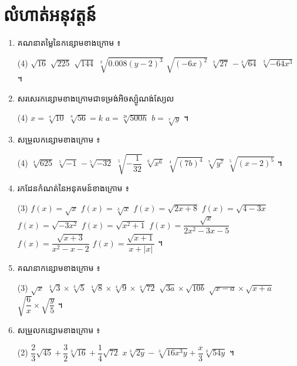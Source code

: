 \section*{លំហាត់អនុវត្តន៍}
\begin{enumerate}[1]
  \item គណនាតម្លៃនៃកន្សោមខាងក្រោម ៖
  \begin{tasks}(4)
    \task $\sqrt{16}$
    \task $\sqrt{225}$
    \task $\sqrt{144}$
    \task $\sqrt[3]{0.008(y - 2)^3}$
    \task $\sqrt{(-6x)^2}$
    \task $\sqrt[3]{27}$
    \task $-\sqrt[3]{64}$
    \task $\sqrt[3]{-64x^3}$ ។
  \end{tasks}
  \item សរសេរកន្សោមខាងក្រោមជាទម្រង់អិចស្ប៉ូណង់ស្យែល
  \begin{tasks}(4)
    \task $x = \sqrt[4]{10}$
    \task $\sqrt[8]{56} = k$
    \task $a = \sqrt[28]{500h}$
    \task $b = \sqrt[x]{y}$ ។
  \end{tasks}
  \item សម្រួលកន្សោមខាងក្រោម ៖
  \begin{tasks}(4)
    \task $\sqrt[4]{625}$
    \task $\sqrt[5]{-1}$
    \task $-\sqrt[5]{-32}$
    \task $\sqrt[5]{-\dfrac{1}{32}}$
    \task $\sqrt[6]{x^6}$
    \task $\sqrt[4]{(7b)^4}$
    \task $\sqrt[7]{y^7}$
    \task $\sqrt[5]{(x - 2)^5}$ ។
  \end{tasks}
  \item រកដែនកំណត់នៃអនុគមន៍ខាងក្រោម ៖
  \begin{tasks}(3)
    \task $f(x) = \sqrt{x}$
    \task $f(x) = \sqrt[3]{x}$
    \task $f(x) = \sqrt{2x + 8}$
    \task $f(x) = \sqrt{4 - 3x}$
    \task $f(x) = \sqrt{-3x^2}$
    \task $f(x) = \sqrt{x^2 + 1}$
    \task $f(x) = \dfrac{\sqrt{x}}{2x^2 - 3x - 5}$
    \task $f(x) = \dfrac{\sqrt{x + 3}}{x^2 - x - 2}$
    \task $f(x) = \dfrac{\sqrt{x + 1}}{x + |x|}$ ។
  \end{tasks}
  \item គណនាកន្សោមខាងក្រោម ៖
  \begin{tasks}(3)
    \task $\sqrt{x}$
    \task $\sqrt[3]{3} \times \sqrt[3]{5}$
    \task $\sqrt[4]{8} \times \sqrt[4]{9} \times \sqrt[4]{72}$
    \task $\sqrt{3a} \times \sqrt{10b}$
    \task $\sqrt{x - a} \times \sqrt{x + a}$
    \task $\sqrt{\dfrac{6}{x}} \times \sqrt{\dfrac{y}{5}}$ ។
  \end{tasks}
  \item សម្រួលកន្សោមខាងក្រោម ៖
  \begin{tasks}(2)
    \task $\dfrac{2}{3}\sqrt{45} + \dfrac{3}{2}\sqrt[3]{16} + \dfrac{1}{4}\sqrt{72}$
    \task $x\sqrt[3]{2y} - \sqrt[3]{16x^3y} + \dfrac{x}{3}\sqrt[3]{54y}$ ។

\end{tasks}
\end{enumerate}
